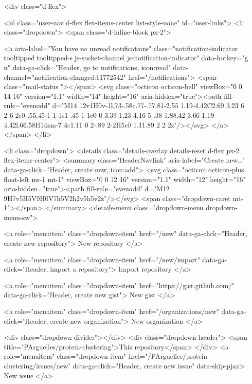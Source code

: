       <div class="d-flex">
        
<ul class="user-nav d-flex flex-items-center list-style-none" id="user-links">
  <li class="dropdown">
    <span class="d-inline-block  px-2">
      
    <a aria-label="You have no unread notifications" class="notification-indicator tooltipped tooltipped-s  js-socket-channel js-notification-indicator" data-hotkey="g n" data-ga-click="Header, go to notifications, icon:read" data-channel="notification-changed:11772542" href="/notifications">
        <span class="mail-status "></span>
        <svg class="octicon octicon-bell" viewBox="0 0 14 16" version="1.1" width="14" height="16" aria-hidden="true"><path fill-rule="evenodd" d="M14 12v1H0v-1l.73-.58c.77-.77.81-2.55 1.19-4.42C2.69 3.23 6 2 6 2c0-.55.45-1 1-1s1 .45 1 1c0 0 3.39 1.23 4.16 5 .38 1.88.42 3.66 1.19 4.42l.66.58H14zm-7 4c1.11 0 2-.89 2-2H5c0 1.11.89 2 2 2z"/></svg>
</a>
    </span>
  </li>

  <li class="dropdown">
    <details class="details-overlay details-reset d-flex px-2 flex-items-center">
      <summary class="HeaderNavlink"
         aria-label="Create new…"
         data-ga-click="Header, create new, icon:add">
        <svg class="octicon octicon-plus float-left mr-1 mt-1" viewBox="0 0 12 16" version="1.1" width="12" height="16" aria-hidden="true"><path fill-rule="evenodd" d="M12 9H7v5H5V9H0V7h5V2h2v5h5v2z"/></svg>
        <span class="dropdown-caret mt-1"></span>
      </summary>
      <details-menu class="dropdown-menu dropdown-menu-sw">
        
<a role="menuitem" class="dropdown-item" href="/new" data-ga-click="Header, create new repository">
  New repository
</a>

  <a role="menuitem" class="dropdown-item" href="/new/import" data-ga-click="Header, import a repository">
    Import repository
  </a>

<a role="menuitem" class="dropdown-item" href="https://gist.github.com/" data-ga-click="Header, create new gist">
  New gist
</a>

  <a role="menuitem" class="dropdown-item" href="/organizations/new" data-ga-click="Header, create new organization">
    New organization
  </a>


  <div class="dropdown-divider"></div>
  <div class="dropdown-header">
    <span title="PArguelles/protein-clustering">This repository</span>
  </div>
    <a role="menuitem" class="dropdown-item" href="/PArguelles/protein-clustering/issues/new" data-ga-click="Header, create new issue" data-skip-pjax>
      New issue
    </a>



